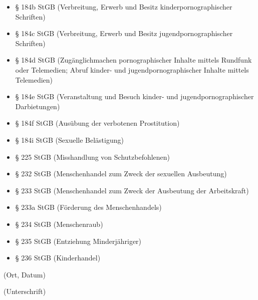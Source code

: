 \documentclass[11pt]{article}
\newcommand{\hint}[1]{{\footnotesize\color{gray}#1}}
\begin{document}
\begin{itemize}[itemsep=-0.1cm]
        \item § 184b StGB (Verbreitung, Erwerb und Besitz kinderpornographischer Schriften)
        \item § 184c StGB (Verbreitung, Erwerb und Besitz jugendpornographischer Schriften)
        \item § 184d StGB (Zugänglichmachen pornographischer Inhalte mittels Rundfunk oder Telemedien; Abruf kinder- und jugendpornographischer Inhalte mittels Telemedien)
        \item § 184e StGB (Veranstaltung und Besuch kinder- und jugendpornographischer Darbietungen)
        \item § 184f StGB (Ausübung der verbotenen Prostitution)
        \item § 184i StGB (Sexuelle Belästigung)
        \item § 225 StGB (Misshandlung von Schutzbefohlenen)
        \item § 232 StGB (Menschenhandel zum Zweck der sexuellen Ausbeutung)
        \item § 233 StGB (Menschenhandel zum Zweck der Ausbeutung der Arbeitskraft)
        \item § 233a StGB (Förderung des Menschenhandels)
        \item § 234 StGB (Menschenraub)
        \item § 235 StGB (Entziehung Minderjähriger)
        \item § 236 StGB (Kinderhandel)
    \end{itemize}

    \vspace{2cm}

    \hrulefill

    \begin{minipage}{0.5\textwidth}
        \hint{(Ort, Datum)}
    \end{minipage}
    \begin{minipage}{0.5\textwidth}
        \hint{(Unterschrift)}
    \end{minipage}
\end{document}
